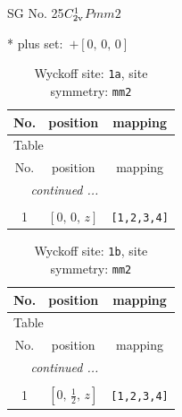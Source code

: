 \documentclass[fleqn,8pt]{jsarticle}
\begin{document}
\setcounter{MaxMatrixCols}{32}

\renewcommand{\tablename}{Table~}
\renewcommand{\figurename}{Figure~}
\begin{center}
\LARGE
SG No. 25\quad$C_{\rm 2v}^{1}$\quad$Pmm2$\quad[ orthorhombic ]
\end{center}
* plus set:\,\,\,$+\left[ 0,\, 0,\, 0 \right]$
\renewcommand{\arraystretch}{1.2}
\begin{longtable}{ccc}
\caption{Wyckoff site: {\tt 1a}, site symmetry: {\tt mm2}}
 \\
 \hline \hline
No. & position & mapping \\ \hline \endfirsthead

\multicolumn{2}{l}{\tablename\ \thetable{}} \\
 \hline \hline
No. & position & mapping \\ \hline \endhead

 \hline \hline
\multicolumn{2}{r}{\footnotesize\it continued ...} \\ \endfoot

 \hline \hline
\multicolumn{2}{r}{} \\ \endlastfoot

1 & $\left[ 0,\, 0,\, z \right]$ & {\tt [1,2,3,4]} \\
\end{longtable}
\renewcommand{\arraystretch}{1.2}
\begin{longtable}{ccc}
\caption{Wyckoff site: {\tt 1b}, site symmetry: {\tt mm2}}
 \\
 \hline \hline
No. & position & mapping \\ \hline \endfirsthead

\multicolumn{2}{l}{\tablename\ \thetable{}} \\
 \hline \hline
No. & position & mapping \\ \hline \endhead

 \hline \hline
\multicolumn{2}{r}{\footnotesize\it continued ...} \\ \endfoot

 \hline \hline
\multicolumn{2}{r}{} \\ \endlastfoot

1 & $\left[ 0,\, \frac{1}{2},\, z \right]$ & {\tt [1,2,3,4]} \\
\end{longtable}
\renewcommand{\arraystretch}{1.2}
\end{document}
